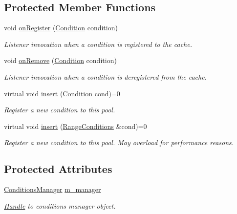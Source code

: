 \subsection*{Protected Member Functions}
\begin{DoxyCompactItemize}
\item 
void \hyperlink{class_d_d4hep_1_1_conditions_1_1_conditions_pool_aac40c7730b4ef3cb08253c98a6d79ee2}{on\+Register} (\hyperlink{class_d_d4hep_1_1_conditions_1_1_condition}{Condition} condition)
\begin{DoxyCompactList}\small\item\em Listener invocation when a condition is registered to the cache. \end{DoxyCompactList}\item 
void \hyperlink{class_d_d4hep_1_1_conditions_1_1_conditions_pool_aadcb09f91ee89996577258c1d9443c88}{on\+Remove} (\hyperlink{class_d_d4hep_1_1_conditions_1_1_condition}{Condition} condition)
\begin{DoxyCompactList}\small\item\em Listener invocation when a condition is deregistered from the cache. \end{DoxyCompactList}\item 
virtual void \hyperlink{class_d_d4hep_1_1_conditions_1_1_conditions_pool_a90abd47fd41d04d96b180aa244786b01}{insert} (\hyperlink{class_d_d4hep_1_1_conditions_1_1_condition}{Condition} cond)=0
\begin{DoxyCompactList}\small\item\em Register a new condition to this pool. \end{DoxyCompactList}\item 
virtual void \hyperlink{class_d_d4hep_1_1_conditions_1_1_conditions_pool_a0acc07312e725ef5fb80e0de276b501e}{insert} (\hyperlink{namespace_d_d4hep_1_1_conditions_ae765f0140a33973a430280f02b6062f4}{Range\+Conditions} \&cond)=0
\begin{DoxyCompactList}\small\item\em Register a new condition to this pool. May overload for performance reasons. \end{DoxyCompactList}\end{DoxyCompactItemize}
\subsection*{Protected Attributes}
\begin{DoxyCompactItemize}
\item 
\hyperlink{class_d_d4hep_1_1_conditions_1_1_conditions_manager}{Conditions\+Manager} \hyperlink{class_d_d4hep_1_1_conditions_1_1_conditions_pool_aae8c23b1a47bad8034196316a2fd41c9}{m\+\_\+manager}
\begin{DoxyCompactList}\small\item\em \hyperlink{class_d_d4hep_1_1_handle}{Handle} to conditions manager object. \end{DoxyCompactList}\end{DoxyCompactItemize}
